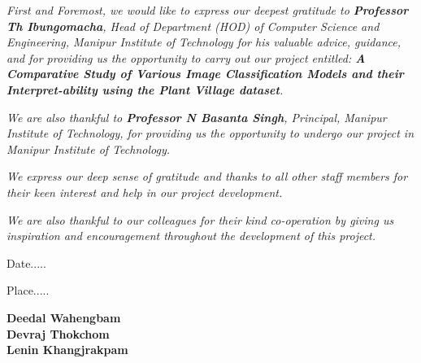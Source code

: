 \documentclass[12pt, oneside, a4paper]{book}
\begin{document}
\begingroup
    \justifying
     \textit{\color{black}\normalsize First and Foremost, we would like to express our deepest gratitude to \textbf{Professor Th Ibungomacha}, Head of Department (HOD) of Computer Science and Engineering, Manipur Institute of Technology for his valuable advice, guidance, and for providing us the opportunity to carry out our project entitled: \textit{\textbf{A Comparative Study of Various Image Classification Models and their Interpret-ability using the Plant Village dataset}}.}
    \par \vspace{0.5em}
    \textit{\normalsize We are also thankful to \textbf{Professor N Basanta Singh}, Principal, Manipur Institute of Technology, for providing us the opportunity to undergo our project in Manipur Institute of Technology.}\par \vspace{0.5em}
    \normalsize \textit{We express our deep sense of gratitude and thanks to all other staff members for their keen interest and help in our project development.}\par \vspace{0.5em}
    \normalsize \textit{We are also thankful to our colleagues for their kind co-operation by giving us inspiration and encouragement throughout the development of this project.}\par \vspace{12em}
\endgroup

\begingroup
    \begin{minipage}[c]{.5\textwidth}
    \RaggedRight
    \large Date.....  \par
    \large Place.....  \par
    \end{minipage}%
    \begin{minipage}[c]{.5\textwidth}
    \RaggedRight
    \normalsize \textbf{Deedal Wahengbam}\\
    \normalsize \textbf{Devraj Thokchom}\\
    \normalsize \textbf{Lenin Khangjrakpam}\\
    \end{minipage}    
\endgroup

\end{document}

